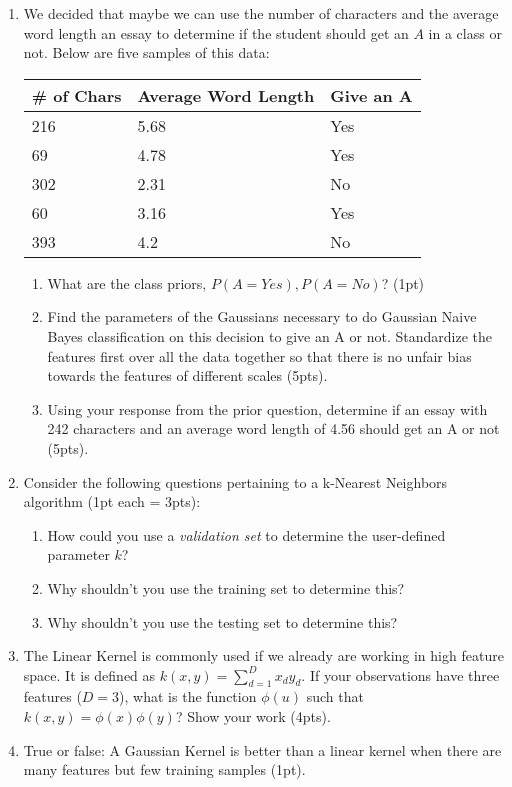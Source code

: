 \documentclass[12pt]{article}
\begin{document}
\begin{enumerate}
\item We decided that maybe we can use the number of characters and the average word length an essay to determine if the student should get an $A$ in a class or not.  Below are five samples of this data:
\begin{table}[h]
\begin{center}
\begin{tabular}{|l|l|l|}
\hline
\# of Chars & Average Word Length & Give an A\\
\hline
216 & 5.68 & Yes\\
69 & 4.78 & Yes\\
302 & 2.31 & No \\
60 & 3.16 & Yes \\
393 & 4.2 & No\\
\hline
\end{tabular}
\end{center}
\end{table}
	\begin{enumerate}
	\item What are the class priors, $P(A=Yes), P(A=No)$? (1pt)
	\item Find the parameters of the Gaussians necessary to do Gaussian Naive Bayes classification on this decision to give an A or not.  Standardize the features first over all the data together so that there is no unfair bias towards the features of different scales (5pts).
	\item Using your response from the prior question, determine if an essay with 242 characters and an average word length of 4.56 should get an A or not (5pts).
	\end{enumerate}
\item Consider the following questions pertaining to a k-Nearest Neighbors algorithm (1pt each = 3pts):
	\begin{enumerate}
	\item How could you use a \emph{validation set} to determine the user-defined parameter $k$?
	\item Why shouldn't you use the training set to determine this?
	\item Why shouldn't you use the testing set to determine this?
	\end{enumerate}
\item The Linear Kernel is commonly used if we already are working in high feature space.  It is defined as $k(x,y)=\sum_{d=1}^D x_d y_d$.  If your observations have three features ($D=3$), what is the function $\phi(u)$ such that $k(x,y)=\phi(x)\phi(y)$?  Show your work (4pts).
\item True or false:  A Gaussian Kernel is better than a linear kernel when there are many features but few training samples (1pt).
\end{enumerate}
\end{document}
